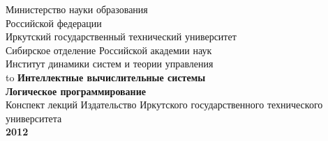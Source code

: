\documentclass[12pt, openany, twoside]{book} %
\begin{document}
\def\chaptername{Тема}
\def\thechapter{\arabic{chapter}}
\def\thefigure{\arabic{section}.\arabic{figure}}
\def\thetable{\arabic{section}.\arabic{table}}
\fancyhf{} %
\fancyhead[RE]{\slshape \leftmark}
\fancyhead[LO]{\slshape \rightmark}
\fancyhead[RO,LE]{\slshape \thepage}
\renewcommand{\headrulewidth}{1pt}
\renewcommand{\footrulewidth}{0pt}%
\pagestyle{fancy}
\begin{titlepage}
\thispagestyle{empty}
\begin{center}
Министерство науки образования\\
Российской федерации\\
{\sc Иркутский государственный технический университет}\\[0.5em]

{Сибирское отделение Российской академии наук}\\
{\sc Институт динамики систем и теории управления}\\
\vfill
 \hbox to \linewidth{\hfill Е.А.~Черкашин}
 \vfill
{\large\bf Интеллектные вычислительные системы\\
Логическое программирование}\\
{Конспект лекций}
\vfill
\vfill
\vfill
 Издательство Иркутского государственного технического университета\\
 {\bf 2012}
\end{center}
\end{titlepage}
\end{document}

